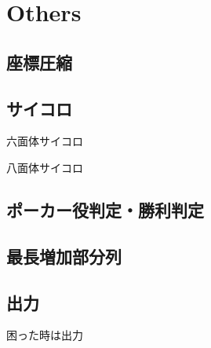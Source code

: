 \section{Others}

\subsection{座標圧縮}


\subsection{サイコロ}
六面体サイコロ

八面体サイコロ


\subsection{ポーカー役判定・勝利判定}


\subsection{最長増加部分列}


\subsection{出力}
困った時は出力


